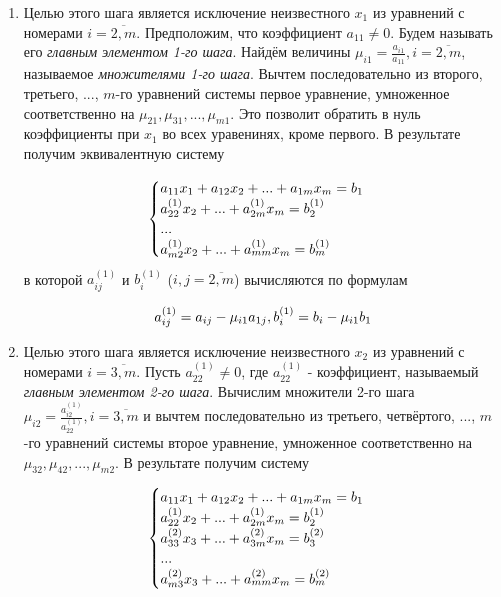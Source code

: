 \documentclass[__main__.tex]{subfiles}
\begin{document}
\begin{enumerate}
	\item 
	Целью этого шага является исключение неизвестного $x_1$ из уравнений с номерами $i=\overline{2,m}$. Предположим, что коэффициент $a_{1 1} \neq 0$. Будем называть его \textit{главным элементом 1-го шага}. Найдём величины $\mu_{i 1} = \frac{a_{i 1}}{a_{1 1}}, i = \overline{2,m}$, называемое \textit{множителями 1-го шага}. Вычтем последовательно из второго, третьего, ..., $m$-го уравнений системы  первое уравнение, умноженное соответственно на $\mu_{2 1}, \mu_{3 1}, ..., \mu_{m 1}$. Это позволит обратить в нуль коэффициенты при $x_1$ во всех уравенинях, кроме первого. В результате получим эквивалентную систему 
	
	\begin{gather}
		\llabel{1_2}
		\begin{cases}
			a_{1 1} x_1 + a_{1 2} x_2 + ... + a_{1 m} x_m = b_1 \\
			a_{2 2}^{(1)} x_2 + ... + a_{2 m}^{(1)} x_m = b_2^{(1)} \\
			... \\
			a_{m 2}^{(1)} x_2 + ... + a_{m m}^{(1)} x_m = b_m^{(1)}
		\end{cases}
	\end{gather}
	в которой $a^{(1)}_{i j}$ и $b^{(1)}_i$ ($i, j = \overline{2,m}$) вычисляются по формулам
	
	\begin{equation}
	\llabel{1_3}
	a^{(1)}_{i j} = a_{i j} - \mu_{i 1} a_{1 j}, b_i^{(1)} = b_i - \mu_{i 1} b_1
	\end{equation}
	
	\item 
	Целью этого шага является исключение неизвестного $x_2$ из уравнений с номерами $i = \overline{3,m}$. Пусть $a^{(1)}_{2 2} \neq 0$, где $a^{(1)}_{2 2}$ - коэффициент, называемый \textit{главным элементом 2-го шага}. Вычислим множители 2-го шага $\mu_{i 2} = \frac{a^{(1)}_{i 2}}{a^{(1)}_{2 2}}, i = \overline{3,m}$ и вычтем последовательно из третьего, четвёртого, ..., $m$-го уравнений системы  второе уравнение, умноженное соответственно на $\mu_{3 2}, \mu_{4 2}, ..., \mu_{m 2}$. В результате получим систему
	
	\begin{gather}
		\llabel{1 4}
		\begin{cases}
			a_{1 1} x_1 + a_{1 2} x_2 + ... + a_{1 m} x_m = b_1 \\
			a_{2 2}^{(1)} x_2 + ... + a_{2 m}^{(1)} x_m = b_2^{(1)} \\
			a^{(2)}_{3 3} x_3 + ... + a^{(2)}_{3 m} x_m = b_3^{(2)} \\
			... \\
			a^{(2)}_{m 3} x_3 + ... + a^{(2)}_{m m} x_m = b_m^{(2)}
		\end{cases}	
	\end{gather}
	

\end{enumerate}
\end{document}
